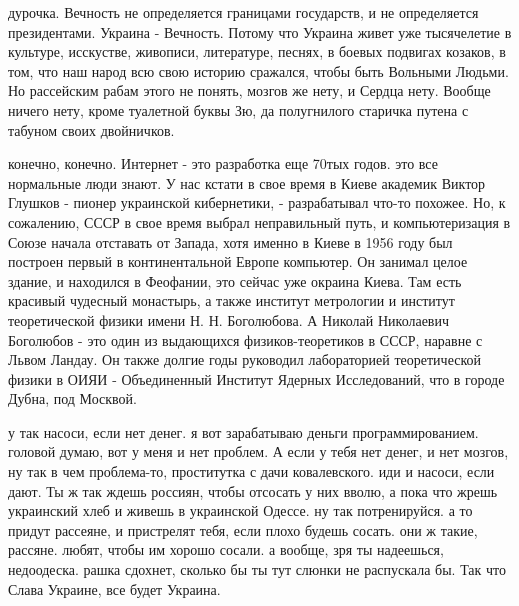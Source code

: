 дурочка. Вечность не определяется границами государств, и не определяется
президентами. Украина - Вечность. Потому что Украина живет уже тысячелетие в
культуре, исскустве, живописи, литературе, песнях, в боевых подвигах козаков, в
том, что наш народ всю свою историю сражался, чтобы быть Вольными Людьми. Но
рассейским рабам этого не понять, мозгов же нету, и Сердца нету. Вообще ничего
нету, кроме туалетной буквы Зю, да полугнилого старичка путена с табуном своих
двойничков.

конечно, конечно. Интернет - это разработка еще 70тых годов. это все нормальные
люди знают. У нас кстати в свое время в Киеве академик Виктор Глушков - пионер
украинской кибернетики, - разрабатывал что-то похожее. Но, к сожалению, СССР в
свое время выбрал неправильный путь, и компьютеризация в Союзе начала отставать
от Запада, хотя именно в Киеве в 1956 году был построен первый в
континентальной Европе компьютер. Он занимал целое здание, и находился в
Феофании, это сейчас уже окраина Киева. Там есть красивый чудесный монастырь, а
также институт метрологии и институт теоретической физики имени Н. Н.
Боголюбова. А Николай Николаевич Боголюбов - это один из выдающихся
физиков-теоретиков в СССР, наравне с Львом Ландау. Он также долгие годы
руководил лабораторией теоретической физики в ОИЯИ - Объединенный Институт
Ядерных Исследований, что в городе Дубна, под Москвой.

у так насоси, если нет денег. я вот зарабатываю деньги программированием.
головой думаю, вот у меня и нет проблем. А если у тебя нет денег, и нет мозгов,
ну так в чем проблема-то, проститутка с дачи ковалевского. иди и насоси, если
дают. Ты ж так ждешь россиян, чтобы отсосать у них вволю, а пока что жрешь
украинский хлеб и живешь в украинской Одессе. ну так потренируйся. а то придут
рассеяне, и пристрелят тебя, если плохо будешь сосать. они ж такие, рассяне.
любят, чтобы им хорошо сосали. а вообще, зря ты надеешься, недоодеска. рашка
сдохнет, сколько бы ты тут слюнки не распускала бы.  Так что Слава Украине, все
будет Украина. 

